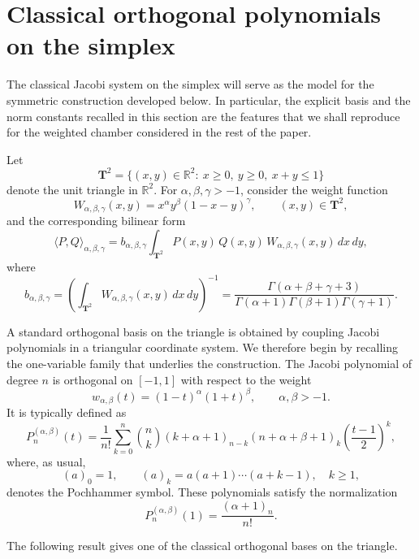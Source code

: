 \documentclass[reqno,10pt]{amsart}
\theoremstyle{plain}
\numberwithin{equation}{section}
\numberwithin{figure}{section}
\begin{document}
\section{Classical orthogonal polynomials on the simplex}\label{sec:classical-simplex}

The classical Jacobi system on the simplex will serve as the model for the
symmetric construction developed below. In particular, the explicit basis and 
the norm constants recalled in this section
are the features that we shall reproduce for the weighted chamber considered
in the rest of the paper.

Let
\[
\mathbf{T}^2=\{(x,y)\in\mathbb{R}^2:\ x\ge 0,\ y\ge 0,\ x+y\le 1\}
\]
denote the unit triangle in $\mathbb{R}^2$. For $\alpha,\beta,\gamma>-1$, consider the weight function
\[
W_{\alpha,\beta,\gamma}(x,y)=x^{\alpha}y^{\beta}(1-x-y)^{\gamma}, \qquad (x,y)\in \mathbf{T}^2,
\]
and the corresponding bilinear form
\[
\langle P,Q\rangle_{\alpha,\beta,\gamma}
=
b_{\alpha,\beta,\gamma}
\int_{\mathbf{T}^2}
P(x,y)\,Q(x,y)\,W_{\alpha,\beta,\gamma}(x,y)\,dx\,dy,
\]
where
\[
b_{\alpha,\beta,\gamma}
=
\left(
\int_{\mathbf{T}^2}
W_{\alpha,\beta,\gamma}(x,y)\,dx\,dy
\right)^{-1}
=
\frac{\Gamma(\alpha+\beta+\gamma+3)}
{\Gamma(\alpha+1)\Gamma(\beta+1)\Gamma(\gamma+1)}.
\]

A standard orthogonal basis on the triangle is obtained by coupling Jacobi polynomials in a triangular coordinate system. We therefore begin by recalling the one-variable family that underlies the construction. The Jacobi polynomial of degree $n$ is orthogonal on $[-1,1]$ with respect to the weight
\[
w_{\alpha,\beta}(t)=(1-t)^{\alpha}(1+t)^{\beta}, \qquad \alpha,\beta>-1.
\]
It is typically defined as \cite[(4.1.1)]{Szego75}
\[
P_n^{(\alpha,\beta)}(t)
=
\frac{1}{n!}
\sum_{k=0}^n
\binom{n}{k}
(k+\alpha+1)_{n-k}
(n+\alpha+\beta+1)_k
\left(\frac{t-1}{2}\right)^k,
\]
where, as usual,
\[
(a)_0=1, \qquad (a)_k=a(a+1)\cdots(a+k-1), \quad k\ge 1,
\]
denotes the Pochhammer symbol. These polynomials satisfy the normalization
\[
P_n^{(\alpha,\beta)}(1)=\frac{(\alpha+1)_n}{n!}.
\]

The following result gives one of the classical orthogonal bases on the triangle.
\end{document}
